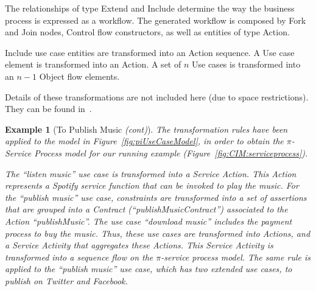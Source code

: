 \documentclass[12pt,twoside]{article}
\theoremstyle{plain}
\theoremstyle{plain}
\newtheorem{example}{Example}
\begin{document}
\begin{multicols}{2}
%
%


The relationships of type  {\sc Extend} and {\sc Include}  determine the way the business process is expressed as a workflow.  
The generated workflow is composed by {\sf Fork} and {\sf Join} nodes,  {\sc Control flow} constructors, as well as entities of type {\sc Action}.


{\sf Include} use case entities are transformed into an {\sf Action} sequence.
A {\sc Use case} element is transformed into an {\sf Action}. 
A set of $n$ {\sc Use cases} is transformed into an  $n-1$ {\sf Object flow} elements. 

Details of these transformations are not included here (due to space restrictions).
They can be found in~\cite{SouzaNeto:2012}.

\begin{example}[To Publish Music \textit{(cont)}]\label{ex:toPublicMusicT1} 
The transformation rules have been applied to the model in Figure~\ref{fig:piUseCaseModel}, in order to obtain the $\pi$-Service Process model for our running example (Figure~\ref{fig:CIM:serviceprocess}).

The ``listen music'' use case is transformed into a Service Action. 
This Action  represents a Spotify service function that can be invoked to play the music. 
For the ``publish music'' use case,  constraints are transformed into a set of assertions that are grouped into a Contract ({\sf ``publishMusicContract''}) associated to the Action {\sf ``publishMusic''}. 
The use case ``download music''  includes the payment process to buy the music. 
Thus, these use cases  are transformed into {\sf Actions}, and a {\sf Service Activity} that aggregates these {\sf Actions}.   
This \textsf{Service Activity} is transformed into a sequence flow on the $\pi$-service process model.
The same rule is applied to the ``publish music'' use case, which has two extended use cases, to publish on Twitter and Facebook.
 \end{example}


\end{multicols}
\end{document}
